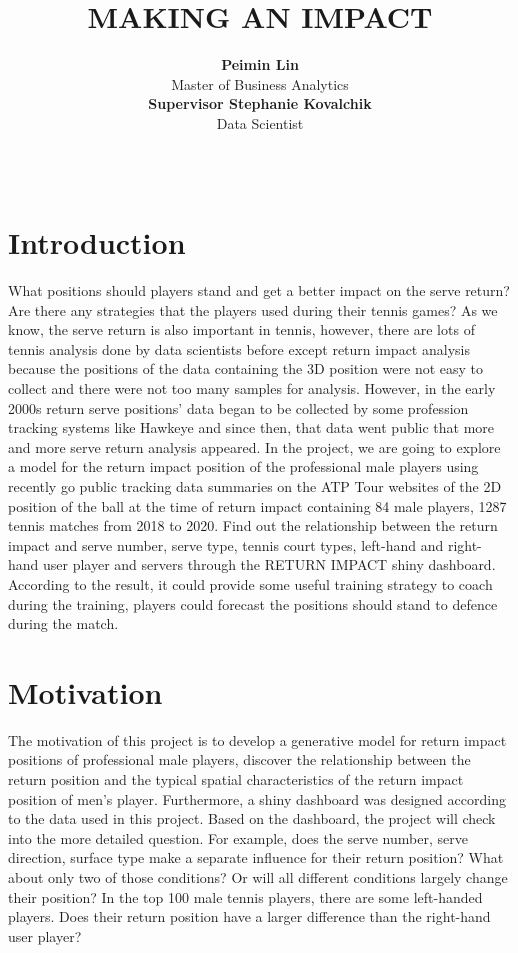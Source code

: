 \documentclass[11pt,a4paper,]{article}
\title{MAKING AN IMPACT}
\author{\sf\Large\textbf{ Peimin Lin}\\ {\sf\large Master of Business Analytics\\[0.5cm]} \sf\Large\textbf{ Supervisor Stephanie Kovalchik}\\ {\sf\large Data Scientist\\[0.5cm]}}
\date{\sf\Date~\Month~\Year}
\makeatletter
\def\titlepage{\front{\expandafter{\@title}}{\@author}{\@organization}}
\makeatother
\begin{document}
\titlepage

\clearpage

\hypertarget{introduction}{%
\section{Introduction}\label{introduction}}

What positions should players stand and get a better impact on the serve return? Are there any strategies that the players used during their tennis games? As we know, the serve return is also important in tennis, however, there are lots of tennis analysis done by data scientists before except return impact analysis because the positions of the data containing the 3D position were not easy to collect and there were not too many samples for analysis. However, in the early 2000s return serve positions' data began to be collected by some profession tracking systems like Hawkeye and since then, that data went public that more and more serve return analysis appeared\autocite{step}. In the project, we are going to explore a model for the return impact position of the professional male players using recently go public tracking data summaries on the ATP Tour websites of the 2D position of the ball at the time of return impact containing 84 male players, 1287 tennis matches from 2018 to 2020. Find out the relationship between the return impact and serve number, serve type, tennis court types, left-hand and right-hand user player and servers through the RETURN IMPACT shiny dashboard. According to the result, it could provide some useful training strategy to coach during the training, players could forecast the positions should stand to defence during the match.

\hypertarget{motivation}{%
\section{Motivation}\label{motivation}}

The motivation of this project is to develop a generative model for return impact positions of professional male players, discover the relationship between the return position and the typical spatial characteristics of the return impact position of men's player. Furthermore, a shiny dashboard was designed according to the data used in this project. Based on the dashboard, the project will check into the more detailed question. For example, does the serve number, serve direction, surface type make a separate influence for their return position? What about only two of those conditions? Or will all different conditions largely change their position? In the top 100 male tennis players, there are some left-handed players. Does their return position have a larger difference than the right-hand user player?
\end{document}
